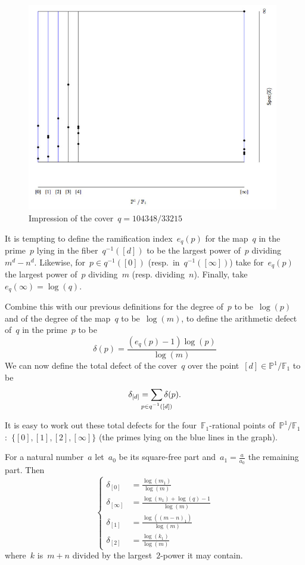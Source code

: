 \begin{figure}[ht]
  \centering
  \includegraphics[width=11cm]{f1-abc/pimap.jpg}
  \caption{Impression of the cover~$q=104348/33215$}
  \label{figure:pi-map}
\end{figure}

It is tempting to define the ramification index~$e_q(p)$ for the map~$q$ in the prime~$p$ lying in the fiber~$q^{-1}([d])$ to be the largest power of~$p$ dividing~$m^d-n^d$. Likewise, for~$p \in q^{-1}([0])$ (resp.\ in~$q^{-1}([\infty])$) take for~$e_q(p)$ the largest power of~$p$ dividing~$m$ (resp. dividing~$n$). Finally, take~$e_q(\infty) = \log(q)$.

Combine this with our previous definitions for the degree of~$p$ to be~$\log(p)$ and of the degree of the map~$q$ to be~$\log(m)$, to define the arithmetic defect of~$q$ in the prime~$p$ to be
\begin{equation}
  \delta(p) = \frac{(e_q(p)-1) \log(p)}{\log(m)}
\end{equation}
We can now define the total defect of the cover~$q$ over the point~$[d] \in \mathbb{P}^1 / \mathbb{F}_1$ to be
\begin{equation}
  \delta_{[d]} = \sum_{\mathclap{p \in q^{-1}([d])}} \delta(p).
\end{equation}

It is easy to work out these total defects for the four~$\mathbb{F}_1$-rational points of~$\mathbb{P}^1 / \mathbb{F}_1$:\ $\{ [0],[1],[2],[\infty] \}$ (the primes lying on the blue lines in the graph). 

For a natural number~$a$ let~$a_0$ be its square-free part and~$a_1 = \tfrac{a}{a_0}$ the remaining part. Then
\begin{equation}
  \left\{
  \begin{aligned}
	  \delta_{[0]} &= \frac{\log(m_1)}{\log(m)} \\
	  \delta_{[\infty]} &= \frac{\log(n_1)+\log(q)-1}{\log(m)} \\
	  \delta_{[1]} &= \frac{\log((m-n)_1)}{\log(m)} \\
	  \delta_{[2]} &= \frac{\log(k_1)}{\log(m)}
  \end{aligned}
  \right.
\end{equation}
where~$k$ is~$m+n$ divided by the largest~$2$-power it may contain. 

